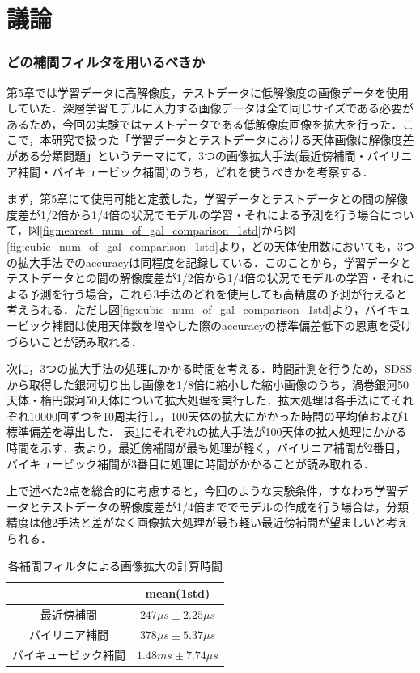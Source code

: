 \documentclass[a4j, 11pt]{jreport}
\begin{document}
\newpage
\section{議論}
\subsubsection{どの補間フィルタを用いるべきか}
第5章では学習データに高解像度，テストデータに低解像度の画像データを使用していた．深層学習モデルに入力する画像データは全て同じサイズである必要があるため，今回の実験ではテストデータである低解像度画像を拡大を行った．ここで，本研究で扱った「学習データとテストデータにおける天体画像に解像度差がある分類問題」というテーマにて，3つの画像拡大手法(最近傍補間・バイリニア補間・バイキュービック補間)のうち，どれを使うべきかを考察する．

まず，第5章にて使用可能と定義した，学習データとテストデータとの間の解像度差が1/2倍から1/4倍の状況でモデルの学習・それによる予測を行う場合について，図\ref{fig:nearest_num_of_gal_comparison_1std}から図\ref{fig:cubic_num_of_gal_comparison_1std}より，どの天体使用数においても，3つの拡大手法でのaccuracyは同程度を記録している．このことから，学習データとテストデータとの間の解像度差が1/2倍から1/4倍の状況でモデルの学習・それによる予測を行う場合，これら3手法のどれを使用しても高精度の予測が行えると考えられる．ただし図\ref{fig:cubic_num_of_gal_comparison_1std}より，バイキュービック補間は使用天体数を増やした際のaccuracyの標準偏差低下の恩恵を受けづらいことが読み取れる．

次に，3つの拡大手法の処理にかかる時間を考える．時間計測を行うため，SDSSから取得した銀河切り出し画像を1/8倍に縮小した縮小画像のうち，渦巻銀河50天体・楕円銀河50天体について拡大処理を実行した．拡大処理は各手法にてそれぞれ10000回ずつを10周実行し，100天体の拡大にかかった時間の平均値および1標準偏差を導出した．
表\ref{tb:calc_cost_by_interpolation}にそれぞれの拡大手法が100天体の拡大処理にかかる時間を示す．表より，最近傍補間が最も処理が軽く，バイリニア補間が2番目，バイキュービック補間が3番目に処理に時間がかかることが読み取れる．

上で述べた2点を総合的に考慮すると，今回のような実験条件，すなわち学習データとテストデータの解像度差が1/4倍まででモデルの作成を行う場合は，分類精度は他2手法と差がなく画像拡大処理が最も軽い最近傍補間が望ましいと考えられる．


\begin{table}[htbp]
  \centering
	\caption{各補間フィルタによる画像拡大の計算時間}
  \begin{tabular}{|c|c|}
		\hline
     & mean(1std) \\ \hline
    最近傍補間 & $247\mu s \pm 2.25\mu s$ \\ \hline
    バイリニア補間 & $378\mu s \pm 5.37\mu s$ \\ \hline
    バイキュービック補間 & $1.48ms \pm 7.74\mu s$ \\ \hline
  \end{tabular}
  \label{tb:calc_cost_by_interpolation}
\end{table}
\end{document}
